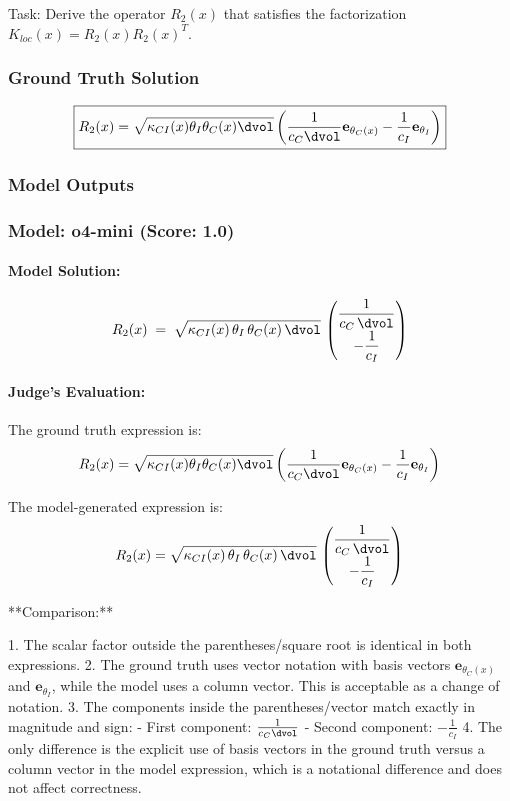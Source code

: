 \documentclass[10pt]{article}
\begin{document}
Task:
Derive the operator $R_2(x)$ that satisfies the factorization $K_{loc}(x) = R_2(x) R_2(x)^T$.

\subsubsection*{Ground Truth Solution}
\[ \boxed{R_{2}(x) = \sqrt{\kappa_{CI}(x)\theta_I\theta_C(x)\dvol} \left( \frac{1}{c_{C}\dvol} \mathbf{e}_{\theta_C(x)} - \frac{1}{c_{I}} \mathbf{e}_{\theta_I} \right)} \]

\subsubsection*{Model Outputs}
\subsubsection*{Model: o4-mini (Score: 1.0)}
\paragraph*{Model Solution:}
\[ R_2(x)\;=\;\sqrt{\kappa_{CI}(x)\,\theta_I\,\theta_C(x)\,\dvol}\,
\begin{pmatrix}
\dfrac{1}{c_C\,\dvol}\\[6pt]
-\dfrac{1}{c_I}
\end{pmatrix} \]

\paragraph*{Judge's Evaluation:}

The ground truth expression is:
\[
R_{2}(x) = \sqrt{\kappa_{CI}(x)\theta_I\theta_C(x)\dvol} \left( \frac{1}{c_{C}\dvol} \mathbf{e}_{\theta_C(x)} - \frac{1}{c_{I}} \mathbf{e}_{\theta_I} \right)
\]

The model-generated expression is:
\[
R_2(x) = \sqrt{\kappa_{CI}(x)\,\theta_I\,\theta_C(x)\,\dvol} \,
\begin{pmatrix}
\dfrac{1}{c_C\,\dvol}\\[6pt]
-\dfrac{1}{c_I}
\end{pmatrix}
\]

**Comparison:**

1. The scalar factor outside the parentheses/square root is identical in both expressions.
2. The ground truth uses vector notation with basis vectors \(\mathbf{e}_{\theta_C(x)}\) and \(\mathbf{e}_{\theta_I}\), while the model uses a column vector. This is acceptable as a change of notation.
3. The components inside the parentheses/vector match exactly in magnitude and sign:
   - First component: \(\frac{1}{c_C \dvol}\)
   - Second component: \(-\frac{1}{c_I}\)
4. The only difference is the explicit use of basis vectors in the ground truth versus a column vector in the model expression, which is a notational difference and does not affect correctness.
\end{document}
